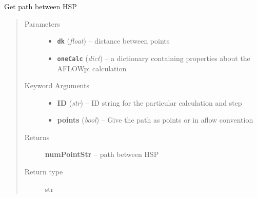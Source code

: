 \documentclass[letterpaper,10pt,english]{sphinxmanual}
\begin{document}
\begin{fulllineitems}
\label{retr:retr.__getPath}
Get path between HSP
\begin{quote}\begin{description}
\item[{Parameters}] \leavevmode\begin{itemize}
\item {} 
\textbf{\texttt{dk}} (\emph{float}) -- distance between points

\item {} 
\textbf{\texttt{oneCalc}} (\emph{dict}) -- a dictionary containing properties about the AFLOWpi calculation

\end{itemize}

\item[{Keyword Arguments}] \leavevmode\begin{itemize}
\item {} 
\textbf{ID} (\emph{str}) --
ID string for the particular calculation and step

\item {} 
\textbf{points} (\emph{bool}) --
Give the path as points or in aflow convention

\end{itemize}

\item[{Returns}] \leavevmode
\textbf{numPointStr} --
path between HSP

\item[{Return type}] \leavevmode
str

\end{description}\end{quote}

\end{fulllineitems}

\end{document}
